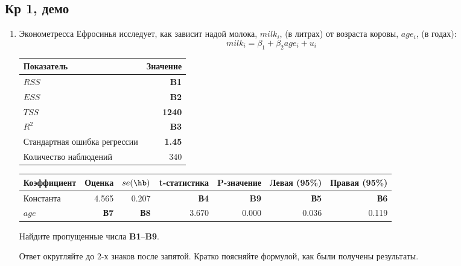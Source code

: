 \documentclass[12pt, a4paper]{article}
\theoremstyle{definition}
\begin{document}
\subsection{Кр 1, демо}












\begin{enumerate}


\item Эконометресса Ефросинья исследует, как зависит надой молока, $milk_i$, (в литрах) от возраста коровы, $age_i$, (в годах):
\[
milk_i = \beta_1 + \beta_2 age_i + u_i
\]

\begin{tabular}{lr} \toprule
Показатель & Значение \\
\midrule
$RSS$                        & \textbf{B1} \\
$ESS$                        & \textbf{B2} \\
$TSS$                        & \textbf{1240} \\
$R^2$                        & \textbf{B3} \\
Стандартная ошибка регрессии & \textbf{1.45} \\
Количество наблюдений        & 340 \\
\bottomrule
\end{tabular}

\begin{tabular}{lrrrrrr} \toprule
Коэффициент & Оценка & $se(\hb)$ & t-статистика & P-значение & Левая (95\%) & Правая (95\%) \\
\midrule
Константа & 4.565 & 0.207 & \textbf{В4} & \textbf{B9} & \textbf{В5} & \textbf{В6} \\
$age$ & \textbf{В7} & \textbf{В8} & 3.670 & 0.000 & 0.036 & 0.119 \\
\bottomrule
\end{tabular}

Найдите пропущенные числа \textbf{B1}--\textbf{B9}.

Ответ округляйте до 2-х знаков после запятой. Кратко поясняйте формулой, как были получены результаты.




\end{enumerate}
\end{document}
